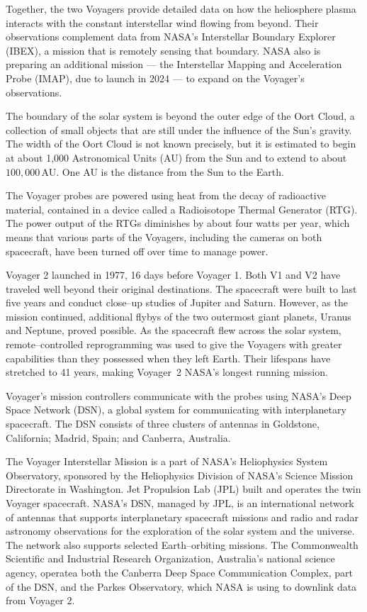 \documentclass[a4paper,openany,12pt]{book}
\begin{document}
Together, the two Voyagers provide detailed data on how the heliosphere plasma interacts with the constant interstellar wind flowing from beyond. Their observations complement data from NASA's Interstellar Boundary Explorer (IBEX), a mission that is remotely sensing that boundary. NASA also is preparing an additional mission --- the Interstellar Mapping and Acceleration Probe (IMAP), due to launch in 2024 --- to expand on the Voyager's observations.

The boundary of the solar system is beyond the outer edge of the Oort Cloud, a collection of small objects that are still under the influence of the Sun's gravity. The width of the Oort Cloud is not known precisely, but it is estimated to begin at about 1,000 Astronomical Units (AU) from the Sun and to extend to about $100,000\,$AU. One AU is the distance from the Sun to the Earth. 

The Voyager probes are powered using heat from the decay of radioactive material, contained in a device called a Radioisotope Thermal Generator (RTG). The power output of the RTGs diminishes by about four watts per year, which means that various parts of the Voyagers, including the cameras on both spacecraft, have been turned off over time to manage power. 

Voyager 2 launched in 1977, 16 days before Voyager 1. Both V1 and V2 have traveled well beyond their original destinations. The spacecraft were built to last five years and conduct close--up studies of Jupiter and Saturn. However, as the mission continued, additional flybys of the two outermost giant planets, Uranus and Neptune, proved possible. As the spacecraft flew across the solar system, remote--controlled reprogramming was used to give the Voyagers with greater capabilities than they possessed when they left Earth. Their lifespans have stretched to 41 years, making Voyager~2 NASA's longest running mission.

Voyager's mission controllers communicate with the probes using NASA's Deep Space Network (DSN), a global system for communicating with interplanetary spacecraft. The DSN consists of three clusters of antennas in Goldstone, California; Madrid, Spain; and Canberra, Australia. 

The Voyager Interstellar Mission is a part of NASA's Heliophysics System Observatory, sponsored by the Heliophysics Division of NASA's Science Mission Directorate in Washington. Jet Propulsion Lab (JPL) built and operates the twin Voyager spacecraft. NASA's DSN, managed by JPL, is an international network of antennas that supports interplanetary spacecraft missions and radio and radar astronomy observations for the exploration of the solar system and the universe. The network also supports selected Earth--orbiting missions. The Commonwealth Scientific and Industrial Research Organization, Australia's national science agency, operatea both the Canberra Deep Space Communication Complex, part of the DSN, and the Parkes Observatory, which NASA is using to downlink data from Voyager 2.
\end{document}
